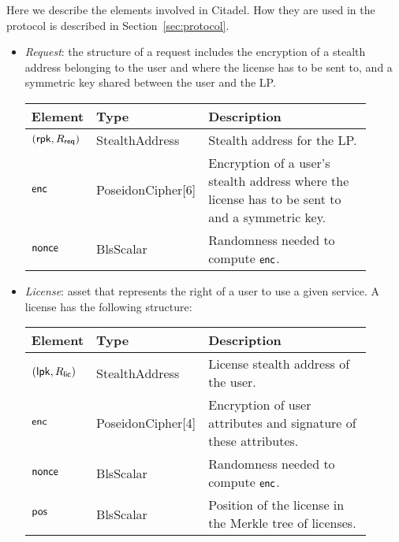 
Here we describe the elements involved in Citadel. How they are used in the protocol is described in Section~\ref{sec:protocol}.

\begin{itemize}
	\itemsep1em 
	\item \emph{Request}: the structure of a request includes the encryption of a stealth address belonging to the user and where the license has to be sent to, and a symmetric key shared between the user and the LP.
	
	\vspace{0.1cm}
	\begin{center}
		\begin{tabular}{ | p{0.15\linewidth} | p{0.2\linewidth} | p{0.55\linewidth} | } 
		\hline
		{Element} & {Type} & {Description} \\
		\hline
		$(\mathsf{rpk}, R_{\mathsf{req}})$ & StealthAddress & Stealth address for the LP. \\
		$\mathsf{enc}$ & PoseidonCipher[6] & Encryption of a user's stealth address where the license has to be sent to and a symmetric key. \\
		$\mathsf{nonce}$ & BlsScalar & Randomness needed to compute $\mathsf{enc}$. \\ 
		\hline
		\end{tabular}
	\end{center}
	
	\item \emph{License}: asset that represents the right of a user to use a given service. A license has the following structure:
	
	\vspace{0.1cm}
    \begin{center}
		\begin{tabular}{ | p{0.15\linewidth} | p{0.2\linewidth} | p{0.55\linewidth} | } 
		\hline
			{Element} & {Type} & {Description} \\
		\hline
		$(\mathsf{lpk}, R_{\mathsf{lic}})$ & StealthAddress & License stealth address of the user. \\
		$\mathsf{enc}$ & PoseidonCipher[4] & Encryption of user attributes and signature of these attributes. \\
		$\mathsf{nonce}$ & BlsScalar & Randomness needed to compute $\mathsf{enc}$. \\ 
		$\mathsf{pos}$ & BlsScalar & Position of the license in the Merkle tree of licenses. \\ 
		\hline
		\end{tabular}
	\end{center}


\end{itemize}
